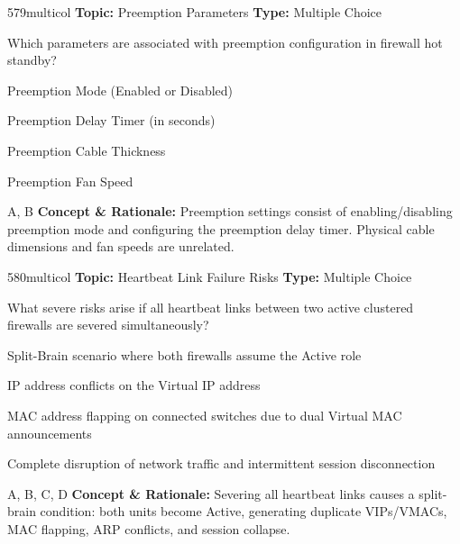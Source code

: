 \begin{qcard}{579}{multicol}
\textcolor{darkslate!75}{\small\textbf{Topic:} Preemption Parameters \hfill \textbf{Type:} Multiple Choice}\vspace{0.4em}\par
Which parameters are associated with preemption configuration in firewall hot standby?
\begin{qoptions}
\item Preemption Mode (Enabled or Disabled)
\item Preemption Delay Timer (in seconds)
\item Preemption Cable Thickness
\item Preemption Fan Speed
\end{qoptions}
\end{qcard}
\nopagebreak
\begin{explainbox}{A, B}
\textbf{Concept \& Rationale:} Preemption settings consist of enabling/disabling preemption mode and configuring the preemption delay timer. Physical cable dimensions and fan speeds are unrelated.
\end{explainbox}

\begin{qcard}{580}{multicol}
\textcolor{darkslate!75}{\small\textbf{Topic:} Heartbeat Link Failure Risks \hfill \textbf{Type:} Multiple Choice}\vspace{0.4em}\par
What severe risks arise if all heartbeat links between two active clustered firewalls are severed simultaneously?
\begin{qoptions}
\item Split-Brain scenario where both firewalls assume the Active role
\item IP address conflicts on the Virtual IP address
\item MAC address flapping on connected switches due to dual Virtual MAC announcements
\item Complete disruption of network traffic and intermittent session disconnection
\end{qoptions}
\end{qcard}
\nopagebreak
\begin{explainbox}{A, B, C, D}
\textbf{Concept \& Rationale:} Severing all heartbeat links causes a split-brain condition: both units become Active, generating duplicate VIPs/VMACs, MAC flapping, ARP conflicts, and session collapse.
\end{explainbox}

